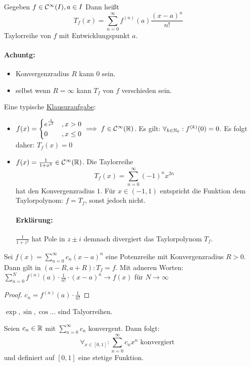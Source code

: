 \begin{definition}
    Gegeben $f \in \mathcal{C}^{\infty}(I), a \in I$ Dann heißt
    \[
    T_f(x)= \sum_{n=0}^{\infty} f^{(n)}(a) \frac{(x-a)^{n}}{n!}
    \]
    Taylorreihe von $f$ mit Entwicklungspunkt $a$. 
\end{definition}
\paragraph{Achuntg:}
\begin{itemize}
    \item Konvergenzradius $R$ kann $0$ sein.
    \item selbst wenn $R=\infty$ kann $T_f$ von $f$ verschieden sein.
\end{itemize}
\begin{example}
Eine typische \underline{Klausuraufgabe}:
\begin{itemize}
    \item $f(x)= \begin{cases}
            e^{\frac{1}{x^2}} &, x>0 \\
            0 &, x\le 0
        \end{cases}\implies f \in \mathcal{C}^{\infty}(\mathbb{R})$. Es gilt: $\forall_{k \in \mathbb{N}_0}: f^{(k)}(0)=0$. Es folgt daher: $T_f(x)=0$   
    \item $f(x)= \frac{1}{1+x^2} \in \mathcal{C}^{\infty}(\mathbb{R})$. Die Taylorreihe \[
    T_f(x) = \sum_{n=0}^{\infty} (-1)^{n}x^{2n}
\] hat den Konvergenzradius $1$. Für $x \in (-1,1)$ entspricht die Funktion dem Taylorpolynom: $f=T_f$, sonst jedoch nicht. \paragraph{Erklärung: } $\frac{1}{1+z^2}$ hat Pole in $z \pm i$ demnach divergiert das Taylorpolynom $T_f$.   
\end{itemize}
\end{example}
\begin{corollary}
Sei $f(x)= \sum_{n=0}^{\infty} c_n(x-a)^{n}$ eine Potenzreihe mit Konvergenzradius $R>0$. Dann gilt in $(a-R,a+R): T_f =f$. Mit adneren Worten: $\sum_{n=0}^{N} f^{(n)}(a) \cdot \frac{1}{n!} \cdot  (x-a)^{n} \to f(x) $ für $N \to \infty$ 
\end{corollary}
\begin{proof}
$c_n= f^{(n)}(a)\cdot \frac{1}{n!}$ 
\end{proof}
\begin{example}
$\exp, \sin, \cos \ldots$ sind Talyorreihen.
\end{example}
\begin{lemma}
Seien $c_n \in \mathbb{R}$ mit $\sum_{n=0}^{\infty} c_n$ konvergent. Dann folgt:
\[
    \forall_{x \in [0,1]}: \sum_{n=0}^{\infty} c_nx^{n} \text{ konvergiert }
\] und definiert auf $[0,1]$ eine stetige Funktion.
\end{lemma}

